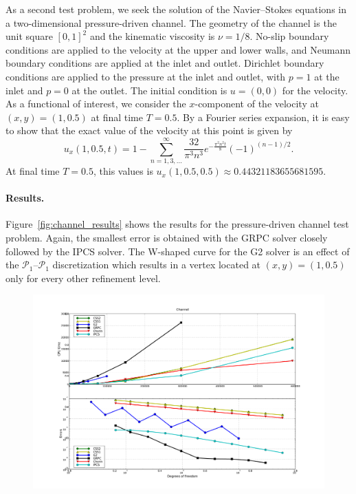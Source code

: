 As a second test problem, we seek the solution of the Navier--Stokes
equations in a two-dimensional pressure-driven channel. The geometry
of the channel is the unit square $[0, 1]^2$ and the kinematic
viscosity is $\nu = 1/8$. No-slip boundary conditions are applied to
the velocity at the upper and lower walls, and Neumann boundary
conditions are applied at the inlet and outlet. Dirichlet boundary
conditions are applied to the pressure at the inlet and outlet, with
$p = 1$ at the inlet and $p = 0$ at the outlet. The initial condition
is $u = (0, 0)$ for the velocity. As a functional of interest, we
consider the $x$-component of the velocity at $(x, y) = (1, 0.5)$ at
final time $T = 0.5$. By a Fourier series expansion, it is easy to
show that the exact value of the velocity at this point is given by
\begin{equation} \label{eq:exact_channel}
  u_x(1, 0.5, t) = 1 - \sum_{n=1,3,...}^\infty \frac{32}{\pi^3 n^3}
  e^{-\frac{\pi^2 n^2 t}{8}} (-1)^{(n-1)/2}.
\end{equation}
At final time $T=0.5$, this values is $u_x(1, 0.5, 0.5) \approx
0.44321183655681595$.

\paragraph{Results.}

Figure~\ref{fig:channel_results} shows the results for the
pressure-driven channel test problem. Again, the smallest error is
obtained with the GRPC solver closely followed by the IPCS solver.
The W-shaped curve for the G2 solver is an effect of the $\mathcal{P}_1$--$\mathcal{P}_1$
discretization which results in a vertex located at $(x, y) = (1,
0.5)$ only for every other refinement level.

\begin{figure}
          {\includegraphics[width=\fullfig]{chapters/kvs-1/pdf/new_channel_res.pdf}}
\end{figure}

